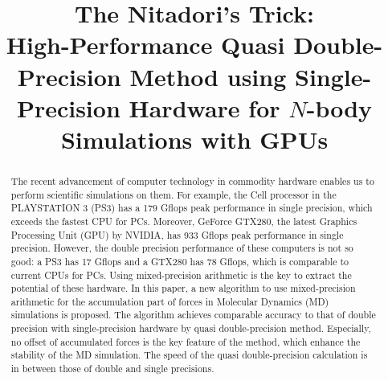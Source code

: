 




\title{The Nitadori's Trick: \\ High-Performance Quasi Double-Precision Method using Single-Precision
       Hardware for $N$-body Simulations with GPUs}

\maketitle


\begin{abstract} The recent advancement of computer technology in 
commodity hardware enables us to perform scientific simulations on
them.  For example, the Cell processor in the PLAYSTATION 3 (PS3) has
a 179 Gflops peak performance in single precision, which exceeds the
fastest CPU for PCs.  Moreover, GeForce GTX280, the latest Graphics
Processing Unit (GPU) by NVIDIA, has 933 Gflops peak performance in
single precision. However, the double precision performance of these
computers is not so good: a PS3 has 17 Gflops and a GTX280 has 78
Gflops, which is comparable to current CPUs for PCs. Using
mixed-precision arithmetic is the key to extract the potential of
these hardware. In this paper, a new algorithm to use mixed-precision
arithmetic for the accumulation part of forces in Molecular Dynamics
(MD) simulations is proposed. The algorithm achieves comparable
accuracy to that of double precision with single-precision hardware by
quasi double-precision method.  Especially, no offset of accumulated
forces is the key feature of the method, which enhance the stability
of the MD simulation.  The speed of the quasi double-precision
calculation is in between those of double and single precisions.
\end{abstract}



